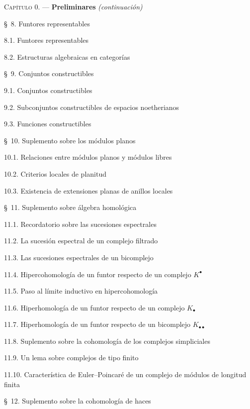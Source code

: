 \documentclass[oneside]{amsart}
\begin{document}
\begin{flushleft}
\textsc{Capítulo 0.} --- \textbf{Preliminares} \textit{(continuación)} 

\medskip
\S~8. Funtores representables 

8.1. Funtores representables 

8.2. Estructuras algebraicas en categorías 

\medskip
\S~9. Conjuntos constructibles 

9.1. Conjuntos constructibles 

9.2. Subconjuntos constructibles de espacios noetherianos 

9.3. Funciones constructibles 

\medskip
\S~10. Suplemento sobre los módulos planos 

10.1. Relaciones entre módulos planos y módulos libres 

10.2. Criterios locales de planitud 

10.3. Existencia de extensiones planas de anillos locales 

\medskip
\S~11. Suplemento sobre álgebra homológica 

11.1. Recordatorio sobre las sucesiones espectrales 

11.2. La sucesión espectral de un complejo filtrado 

11.3. Las sucesiones espectrales de un bicomplejo 

11.4. Hipercohomología de un funtor respecto de un complejo $K^\bullet$

11.5. Paso al límite inductivo en hipercohomología 

11.6. Hiperhomología de un funtor respecto de un complejo $K_\bullet$

11.7. Hiperhomología de un funtor respecto de un bicomplejo
$K_{\bullet\bullet}$ 

11.8. Suplemento sobre la cohomología de los complejos simpliciales 

11.9. Un lema sobre complejos de tipo finito 

11.10. Característica de Euler--Poincaré de un complejo de módulos de longitud finita

\medskip
\S~12. Suplemento sobre la cohomología de haces 


\end{flushleft}
\end{document}
